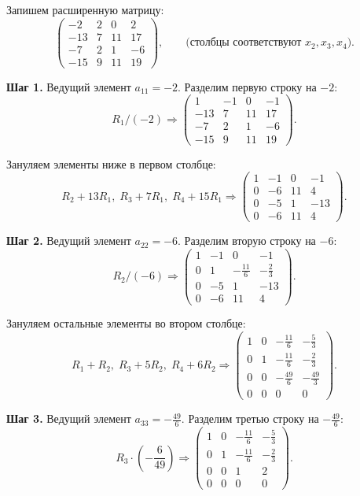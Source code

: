 \documentclass[a4paper,14pt]{extarticle}
\begin{document}
Запишем расширенную матрицу:
\[
\left(
\begin{array}{ccc|c}
-2 & 2 & 0  & 2\\
-13& 7 & 11 & 17\\
-7 & 2 & 1  & -6\\
-15& 9 & 11 & 19
\end{array}
\right),
\qquad
\text{(столбцы соответствуют } x_2,x_3,x_4\text{).}
\]

\textbf{Шаг 1.} Ведущий элемент \(a_{11}=-2\). Разделим первую строку на \(-2\):
\[
R_1/(-2)\Rightarrow
\left(
\begin{array}{ccc|c}
1 & -1 & 0 & -1\\
-13& 7  & 11& 17\\
-7 & 2  & 1 & -6\\
-15& 9  & 11& 19
\end{array}
\right).
\]

Зануляем элементы ниже в первом столбце:
\[
R_2+13R_1,\; R_3+7R_1,\; R_4+15R_1\Rightarrow
\left(
\begin{array}{ccc|c}
1 & -1 & 0  & -1\\
0 & -6 & 11 & 4\\
0 & -5 & 1  & -13\\
0 & -6 & 11 & 4
\end{array}
\right).
\]

\textbf{Шаг 2.} Ведущий элемент \(a_{22}=-6\). Разделим вторую строку на \(-6\):
\[
R_2/(-6)\Rightarrow
\left(
\begin{array}{ccc|c}
1 & -1 & 0 & -1\\
0 & 1 & -\frac{11}{6} & -\frac{2}{3}\\
0 & -5 & 1 & -13\\
0 & -6 & 11 & 4
\end{array}
\right).
\]

Зануляем остальные элементы во втором столбце:
\[
R_1+R_2,\; R_3+5R_2,\; R_4+6R_2\Rightarrow
\left(
\begin{array}{ccc|c}
1 & 0 & -\frac{11}{6} & -\frac{5}{3}\\
0 & 1 & -\frac{11}{6} & -\frac{2}{3}\\
0 & 0 & -\frac{49}{6} & -\frac{49}{3}\\
0 & 0 & 0 & 0
\end{array}
\right).
\]

\textbf{Шаг 3.} Ведущий элемент \(a_{33}=-\frac{49}{6}\). Разделим третью строку на \(-\frac{49}{6}\):
\[
R_3\cdot\left(-\frac{6}{49}\right)\Rightarrow
\left(
\begin{array}{ccc|c}
1 & 0 & -\frac{11}{6} & -\frac{5}{3}\\
0 & 1 & -\frac{11}{6} & -\frac{2}{3}\\
0 & 0 & 1 & 2\\
0 & 0 & 0 & 0
\end{array}
\right).
\]
\end{document}
